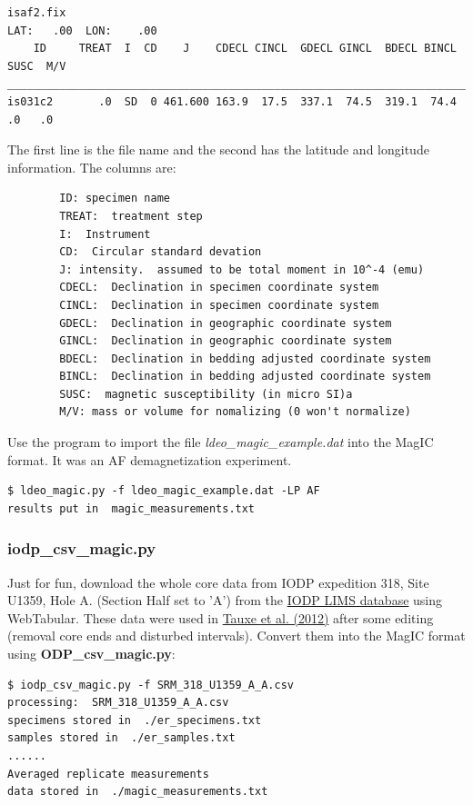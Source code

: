 \documentclass[11pt]{book}
\begin{document}
{{{{\begin{verbatim}
isaf2.fix
LAT:   .00  LON:    .00
    ID     TREAT  I  CD    J    CDECL CINCL  GDECL GINCL  BDECL BINCL  SUSC  M/V
________________________________________________________________________________
is031c2       .0  SD  0 461.600 163.9  17.5  337.1  74.5  319.1  74.4    .0   .0
\end{verbatim}
The first line is the file name and the second has the latitude and longitude information. The columns are:
\begin{verbatim}
        ID: specimen name
        TREAT:  treatment step
        I:  Instrument
        CD:  Circular standard devation
        J: intensity.  assumed to be total moment in 10^-4 (emu)
        CDECL:  Declination in specimen coordinate system
        CINCL:  Declination in specimen coordinate system
        GDECL:  Declination in geographic coordinate system
        GINCL:  Declination in geographic coordinate system
        BDECL:  Declination in bedding adjusted coordinate system
        BINCL:  Declination in bedding adjusted coordinate system
        SUSC:  magnetic susceptibility (in micro SI)a
        M/V: mass or volume for nomalizing (0 won't normalize)
\end{verbatim}

Use the program to import the file {\it ldeo\_magic\_example.dat} into the MagIC format.  It was an AF demagnetization experiment.

\begin{verbatim}
$ ldeo_magic.py -f ldeo_magic_example.dat -LP AF
results put in  magic_measurements.txt
\end{verbatim}

\subsubsection{iodp\_csv\_magic.py}

Just for fun, download the whole core data from IODP expedition 318, Site U1359, Hole A. (Section Half set to 'A') from the \href{#LIMS}{IODP LIMS database} using WebTabular.    These data were used in \href{http://dx.doi.org/10.1029/2012PA002308}{Tauxe et al. (2012)} \nocite{tauxe12} after some editing (removal core ends and disturbed intervals).   Convert them into the MagIC format using {\bf ODP\_csv\_magic.py}:

\begin{verbatim}
$ iodp_csv_magic.py -f SRM_318_U1359_A_A.csv
processing:  SRM_318_U1359_A_A.csv
specimens stored in  ./er_specimens.txt
samples stored in  ./er_samples.txt
......
Averaged replicate measurements
data stored in  ./magic_measurements.txt
\end{verbatim}

}}}}
\end{document}
